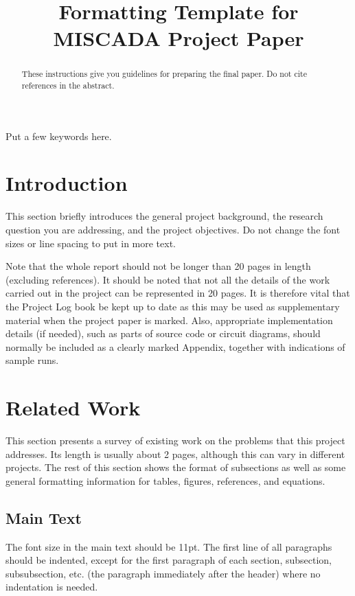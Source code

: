 \documentclass[11pt,a4paper]{article}
\title{Formatting Template for MISCADA Project Paper}
\author{} %
\date{}
\begin{document}
\maketitle

\begin{abstract}
These instructions give you guidelines for preparing the final paper. Do not cite references in the abstract.
\end{abstract}

\begin{keywords}
Put a few keywords here.
\end{keywords}

\section{Introduction}
This section briefly introduces the general project background, the research question you are addressing, and the project objectives. Do not change the font sizes or line spacing to put in more text. 

Note that the whole report should not be longer than 20 pages in length (excluding references). It should be noted that not all the details of the work carried out in the project can be represented in 20 pages. It is therefore vital that the Project Log book be kept up to date as this may be used as supplementary material when the project paper is marked. Also, appropriate implementation details (if needed), such as parts of source code or circuit diagrams, should normally be included as a clearly marked Appendix, together with indications of sample runs.


\section{Related Work}
This section presents a survey of existing work on the problems that this project addresses. Its length is usually about 2 pages, although this can vary in different projects. The rest of this section shows the format of subsections as well as some general formatting information for tables, figures, references, and equations.

\subsection{Main Text}

The font size in the main text should be 11pt. The first line of all paragraphs should be indented, except for the first paragraph of each section, subsection, subsubsection, etc. (the paragraph immediately after the header) where no indentation is needed.
\end{document}
